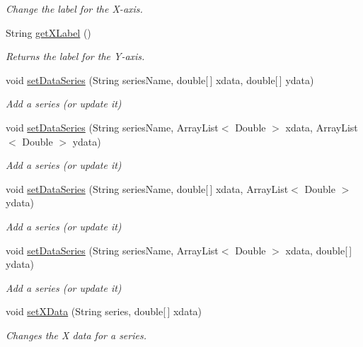 \begin{DoxyCompactItemize}
\begin{DoxyCompactList}\small\item\em Change the label for the X-\/axis. \end{DoxyCompactList}\item 
String \hyperlink{classbridges_1_1base_1_1_line_chart_a0885f5c62f950d96397b1704da6e2798}{get\+X\+Label} ()
\begin{DoxyCompactList}\small\item\em Returns the label for the Y-\/axis. \end{DoxyCompactList}\item 
void \hyperlink{classbridges_1_1base_1_1_line_chart_a586e9953b13e51ab9e592acfb034887b}{set\+Data\+Series} (String series\+Name, double\mbox{[}$\,$\mbox{]} xdata, double\mbox{[}$\,$\mbox{]} ydata)
\begin{DoxyCompactList}\small\item\em Add a series (or update it) \end{DoxyCompactList}\item 
void \hyperlink{classbridges_1_1base_1_1_line_chart_ab3b577798d421da8d8519d73dcf7ceaf}{set\+Data\+Series} (String series\+Name, Array\+List$<$ Double $>$ xdata, Array\+List$<$ Double $>$ ydata)
\begin{DoxyCompactList}\small\item\em Add a series (or update it) \end{DoxyCompactList}\item 
void \hyperlink{classbridges_1_1base_1_1_line_chart_ac650a150cfbf2e572a5ccdb5d25cb00b}{set\+Data\+Series} (String series\+Name, double\mbox{[}$\,$\mbox{]} xdata, Array\+List$<$ Double $>$ ydata)
\begin{DoxyCompactList}\small\item\em Add a series (or update it) \end{DoxyCompactList}\item 
void \hyperlink{classbridges_1_1base_1_1_line_chart_a38eb16930491bc047a5343dd73052219}{set\+Data\+Series} (String series\+Name, Array\+List$<$ Double $>$ xdata, double\mbox{[}$\,$\mbox{]} ydata)
\begin{DoxyCompactList}\small\item\em Add a series (or update it) \end{DoxyCompactList}\item 
void \hyperlink{classbridges_1_1base_1_1_line_chart_a2918179283e8280d47abb43df3c59195}{set\+X\+Data} (String series, double\mbox{[}$\,$\mbox{]} xdata)
\begin{DoxyCompactList}\small\item\em Changes the X data for a series. \end{DoxyCompactList}\item 

\end{DoxyCompactItemize}
